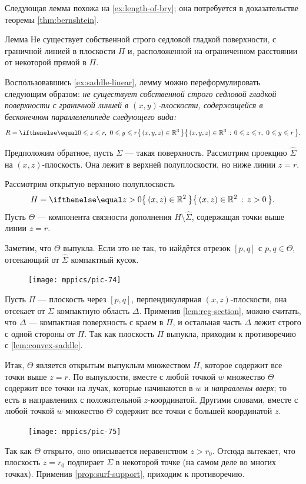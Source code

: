 Следующая лемма похожа на \ref{ex:length-of-bry};
она потребуется в доказательстве теоремы \ref{thm:bernshtein}.

\begin{thm}{Лемма}\label{lem:region}
Не существует собственной строго седловой гладкой поверхности, с граничной линией в плоскости $\Pi$ и, расположенной на ограниченном расстоянии от некоторой прямой в $\Pi$.
\end{thm}

Воспользовавшись \ref{ex:saddle-linear}, лемму можно переформулировать следующим образом:
\textit{не существует собственной строго седловой гладкой поверхности 
с граничной линией в $(x,y)$-плоскости,
содержащейся в бесконечном параллелепипеде следующего вида:}
\[R=\set{(x,y,z)\in\mathbb{R}^3}{0\le z\le r,\  0\le y\le r}.\]

Предположим обратное, пусть $\Sigma$ --- такая поверхность.
Рассмотрим проекцию $\hat \Sigma$ на $(x,z)$-плоскость.
Она лежит в верхней полуплоскости, но ниже линии $z=r$.

Рассмотрим открытую верхнюю полуплоскость
\[H=\set{(x,z)\in \mathbb{R}^2}{z> 0}.\] 
Пусть $\Theta$ --- компонента связности дополнения $H\setminus \hat \Sigma$, содержащая точки выше линии $z=r$.

Заметим, что $\Theta$ выпукла.
Если это не так, то найдётся отрезок $[p,q]$ с $p,q\in \Theta$, отсекающий от $\hat\Sigma$ компактный кусок.
\begin{figure}[!ht]
\vskip-1mm
\centering
\texttt{[image: mppics/pic-74]}
\vskip-1mm
\end{figure}
Пусть $\Pi$ --- плоскость через $[p,q]$, перпендикулярная $(x,z)$-плоскости, она отсекает от $\Sigma$ компактную область $\Delta$.
Применив \ref{lem:reg-section}, можно считать, что $\Delta$ --- компактная поверхность с краем в $\Pi$, и остальная часть $\Delta$ лежит строго с одной стороны от $\Pi$.
Так как плоскость $\Pi$ выпукла, приходим к противоречию с \ref{lem:convex-saddle}.

Итак, $\Theta$ является открытым выпуклым множеством $H$, которое содержит все точки выше $z=r$.
По выпуклости, вместе с любой точкой $w$ множество $\Theta$ содержит все точки на лучах, которые начинаются в $w$ и \textit{направлены вверх}; то есть в направлениях с положительной $z$-координатой. 
Другими словами, вместе с любой точкой $w$
множество $\Theta$ содержит все точки с большей координатой $z$.
\begin{figure}[!ht]
\vskip-1mm
\centering
\texttt{[image: mppics/pic-75]}
\vskip-1mm
\end{figure}
Так как $\Theta$ открыто, оно описывается неравенством $z>r_0$.
Отсюда вытекает, что плоскость $z=r_0$ подпирает $\Sigma$ в некоторой точке (на самом деле во многих точках).
Применив \ref{prop:surf-support}, приходим к противоречию.
\qeds


